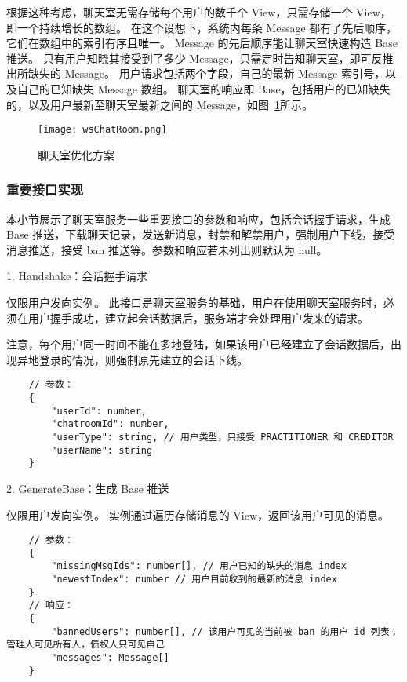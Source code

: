 根据这种考虑，聊天室无需存储每个用户的数千个 View，只需存储一个 View，即一个持续增长的数组。
在这个设想下，系统内每条 Message 都有了先后顺序，它们在数组中的索引有序且唯一。
Message 的先后顺序能让聊天室快速构造 Base 推送。
只有用户知晓其接受到了多少 Message，只需定时告知聊天室，即可反推出所缺失的 Message。
用户请求包括两个字段，自己的最新 Message 索引号，以及自己的已知缺失 Message 数组。
聊天室的响应即 Base，包括用户的已知缺失的，以及用户最新至聊天室最新之间的 Message，如图~\ref{fig:wsChatRoom}所示。
\begin{figure}[!htp]
    \centering
    \texttt{[image: wsChatRoom.png]}
    \caption{聊天室优化方案}
    \label{fig:wsChatRoom}
  \end{figure}

  \subsubsection{重要接口实现}
  本小节展示了聊天室服务一些重要接口的参数和响应，包括会话握手请求，生成 Base 推送，下载聊天记录，发送新消息，封禁和解禁用户，强制用户下线，接受消息推送，接受 ban 推送等。参数和响应若未列出则默认为 null。

  1. Handshake：会话握手请求

  仅限用户发向实例。
  此接口是聊天室服务的基础，用户在使用聊天室服务时，必须在用户握手成功，建立起会话数据后，服务端才会处理用户发来的请求。

  注意，每个用户同一时间不能在多地登陆，如果该用户已经建立了会话数据后，出现异地登录的情况，则强制原先建立的会话下线。

  {\setmainfont{Courier New Bold}
  \begin{lstlisting}
    // 参数：
    {
        "userId": number,
        "chatroomId": number,
        "userType": string, // 用户类型，只接受 PRACTITIONER 和 CREDITOR
        "userName": string
    }
   \end{lstlisting}}

   2. GenerateBase：生成 Base 推送

   仅限用户发向实例。
   实例通过遍历存储消息的 View，返回该用户可见的消息。

   {\setmainfont{Courier New Bold}
   \begin{lstlisting}
    // 参数：
    {
        "missingMsgIds": number[], // 用户已知的缺失的消息 index
        "newestIndex": number // 用户目前收到的最新的消息 index
    }
    // 响应：
    {
        "bannedUsers": number[], // 该用户可见的当前被 ban 的用户 id 列表；管理人可见所有人，债权人只可见自己
        "messages": Message[]
    }
    \end{lstlisting}}

